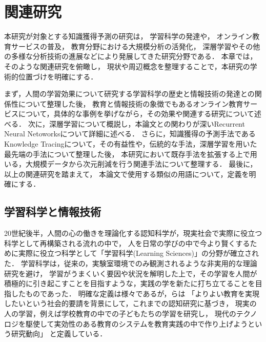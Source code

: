 \chapter{関連研究}
\label{chap:previous}
\fancyhf{}
\rhead{\thepage}
\cfoot{\thepage}


本研究が対象とする知識獲得予測の研究は，
学習科学の発達や，
オンライン教育サービスの普及，
教育分野における大規模分析の活発化，
深層学習やその他の多様な分析技術の進展などにより発展してきた研究分野である．
本章では，そのような関連研究を俯瞰し，
現状や周辺概念を整理することで，本研究の学術的位置づけを明確にする．


まず，人間の学習効果について研究する学習科学の歴史と情報技術の発達との関係性について整理した後，
教育と情報技術の象徴でもあるオンライン教育サービスについて，具体的な事例を挙げながら，その効果や関連する研究について述べる．
次に，深層学習について概説し，本論文との関わりが深いRecurrent Neural Netoworksについて詳細に述べる．
さらに，知識獲得の予測手法であるKnowledge Tracingについて，その有益性や，伝統的な手法，深層学習を用いた最先端の手法について整理した後，
本研究において既存手法を拡張する上で用いる，大規模データから次元削減を行う関連手法について整理する．
最後に，以上の関連研究を踏まえて，
本論文で使用する類似の用語について，定義を明確にする．


\section{学習科学と情報技術}

20世紀後半，人間の心の働きを理論化する認知科学が，現実社会で実際に役立つ科学として再構築される流れの中で，
人を日常の学びの中で今より賢くするために実際に役立つ科学として「学習科学(Learning Sciences)」の分野が確立された\cite{白水始2014学習科学の新展開}．
学習科学は，従来の，実験室環境でのみ観測されるような非実用的な理論研究を避け，
学習がうまくいく要因や状況を解明した上で，その学習を人間が積極的に引き起こすことを目指すような，実践の学を新たに打ち立てることを目指したものであった．
明確な定義は様々であるが，\cite{三宅なほみ2002学習環境のデザイン実験}らは
「よりよい教育を実現したいという社会的要請を背景にして，これまでの認知研究に基づき，
現実の人の学習，例えば学校教育の中での子どもたちの学習を研究し，
現代のテクノロジを駆使して実効性のある教育のシステムを教育実践の中で作り上げようという研究動向」
と定義している．


